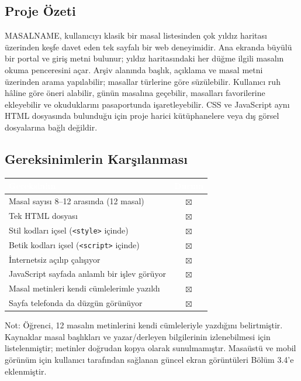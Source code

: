 \documentclass[12pt,a4paper]{article}
\begin{document}
\subsection{Proje Özeti}
MASALNAME, kullanıcıyı klasik bir masal listesinden çok yıldız haritası üzerinden keşfe davet eden tek sayfalı bir web deneyimidir. Ana ekranda büyülü bir portal ve giriş metni bulunur; yıldız haritasındaki her düğme ilgili masalın okuma penceresini açar. Arşiv alanında başlık, açıklama ve masal metni üzerinden arama yapılabilir; masallar türlerine göre süzülebilir. Kullanıcı ruh hâline göre öneri alabilir, günün masalına geçebilir, masalları favorilerine ekleyebilir ve okuduklarını pasaportunda işaretleyebilir. CSS ve JavaScript aynı HTML dosyasında bulunduğu için proje harici kütüphanelere veya dış görsel dosyalarına bağlı değildir.

\subsection{Gereksinimlerin Karşılanması}
\begin{center}
\begin{tabular}{@{}p{8.2cm}c@{}}
\toprule
\rowcolor{ana}\textcolor{white}{\textbf{Gereksinim}} & \textcolor{white}{\textbf{Durum}} \\
\midrule
Masal sayısı 8--12 arasında (12 masal)             & $\boxtimes$ \\
Tek HTML dosyası                                    & $\boxtimes$ \\
Stil kodları içsel (\texttt{<style>} içinde)        & $\boxtimes$ \\
Betik kodları içsel (\texttt{<script>} içinde)      & $\boxtimes$ \\
İnternetsiz açılıp çalışıyor                        & $\boxtimes$ \\
JavaScript sayfada anlamlı bir işlev görüyor        & $\boxtimes$ \\
Masal metinleri kendi cümlelerimle yazıldı          & $\boxtimes$ \\
Sayfa telefonda da düzgün görünüyor                 & $\boxtimes$ \\
\bottomrule
\end{tabular}
\end{center}
Not: Öğrenci, 12 masalın metinlerini kendi cümleleriyle yazdığını belirtmiştir. Kaynaklar masal başlıkları ve yazar/derleyen bilgilerinin izlenebilmesi için listelenmiştir; metinler doğrudan kopya olarak sunulmamıştır. Masaüstü ve mobil görünüm için kullanıcı tarafından sağlanan güncel ekran görüntüleri Bölüm 3.4’e eklenmiştir.
\end{document}
